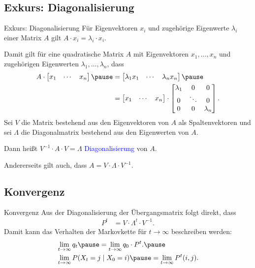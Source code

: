 \documentclass{beamer}
\def\spadding{\vspace{0.25cm}}
\def\b{\textcolor{blue}}
\begin{document}
\subsection{Exkurs: Diagonalisierung}
\begin{frame}{Exkurs: Diagonalisierung}
    Für Eigenvektoren $x_i$ und zugehörige Eigenwerte $\lambda_i$ einer Matrix $A$ gilt $A \cdot x_i = \lambda_i \cdot x_i$.\pause\par\spadding
    Damit gilt für eine quadratische Matrix $A$ mit Eigenvektoren $x_1, \dots, x_n$ und zugehörigen Eigenwerten $\lambda_1, \dots, \lambda_n$\pause, dass
    \begin{align*}
        A \cdot \begin{bmatrix}
            x_1 & \cdots & x_n
        \end{bmatrix}\pause &= \begin{bmatrix}
            \lambda_1 x_1 & \cdots & \lambda_n x_n
        \end{bmatrix}\pause \\
        &= \begin{bmatrix}
            x_1 & \cdots & x_n
        \end{bmatrix} \cdot \begin{bmatrix}
            \lambda_1 & 0 & 0 \\
            0 & \ddots & 0 \\
            0 & 0 & \lambda_n
        \end{bmatrix}.
    \end{align*}\pause
    Sei $V$ die Matrix bestehend aus den Eigenvektoren von $A$ als Spaltenvektoren und sei $\Lambda$ die Diagonalmatrix bestehend aus den Eigenwerten von $A$.\pause\par\spadding
    Dann heißt $V^{-1} \cdot A \cdot V = \Lambda$ \b{Diagonalisierung} von $A$.\pause\par
    Andererseits gilt auch, dass $A = V \cdot \Lambda \cdot V^{-1}$.
\end{frame}

\subsection{Konvergenz}
\begin{frame}{Konvergenz}
    Aus der Diagonalisierung der Übergangsmatrix folgt direkt, dass
    \begin{align*}
                                     P^t &= V \cdot \Lambda^t \cdot V^{-1}.
    \end{align*}\pause
    Damit kann das Verhalten der Markovkette für $t \to \infty$ beschreiben werden:
    \begin{align*}
        &\lim_{t \to \infty} q_t\pause = \lim_{t \to \infty} q_0 \cdot P^t.\pause \\
        &\lim_{t \to \infty} P(X_t = j \mid X_0 = i)\pause = \lim_{t \to \infty} P^t(i,j).
    \end{align*}
\end{frame}
\end{document}
